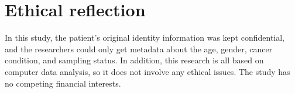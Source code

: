 \chapter{Ethical reflection}

In this study, the patient’s original identity information was kept confidential, and the researchers could only get metadata about the age, gender, cancer condition, and sampling status. In addition, this research is all based on computer data analysis, so it does not involve any ethical issues.
The study has no competing financial interests.


